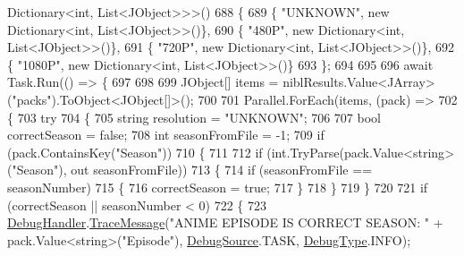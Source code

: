 \begin{DoxyCode}
       Dictionary<int, List<JObject>>>()
688             \{
689                 \{ \textcolor{stringliteral}{"UNKNOWN"}, \textcolor{keyword}{new} Dictionary<int, List<JObject>>()\},
690                 \{ \textcolor{stringliteral}{"480P"}, \textcolor{keyword}{new} Dictionary<int, List<JObject>>()\},
691                 \{ \textcolor{stringliteral}{"720P"}, \textcolor{keyword}{new} Dictionary<int, List<JObject>>()\},
692                 \{ \textcolor{stringliteral}{"1080P"}, \textcolor{keyword}{new} Dictionary<int, List<JObject>>()\}
693             \};
694 
695 
696             await Task.Run(() => \{
697 
698 
699                 JObject[] items = niblResults.Value<JArray>(\textcolor{stringliteral}{"packs"}).ToObject<JObject[]>();
700 
701                 Parallel.ForEach(items, (pack) =>
702                 \{
703                     \textcolor{keywordflow}{try}
704                     \{
705                         \textcolor{keywordtype}{string} resolution = \textcolor{stringliteral}{"UNKNOWN"};
706 
707                         \textcolor{keywordtype}{bool} correctSeason = \textcolor{keyword}{false};
708                         \textcolor{keywordtype}{int} seasonFromFile = -1;
709                         \textcolor{keywordflow}{if} (pack.ContainsKey(\textcolor{stringliteral}{"Season"}))
710                         \{
711 
712                             \textcolor{keywordflow}{if} (\textcolor{keywordtype}{int}.TryParse(pack.Value<\textcolor{keywordtype}{string}>(\textcolor{stringliteral}{"Season"}), out seasonFromFile))
713                             \{
714                                 \textcolor{keywordflow}{if} (seasonFromFile == seasonNumber)
715                                 \{
716                                     correctSeason = \textcolor{keyword}{true};
717                                 \}
718                             \}
719                         \}
720 
721                         \textcolor{keywordflow}{if} (correctSeason || seasonNumber < 0)
722                         \{
723                             \mbox{\hyperlink{class_little_weeb_library_1_1_handlers_1_1_anime_profile_handler_a0b0ae3c3838d26351485e6dfc566a632}{DebugHandler}}.\mbox{\hyperlink{interface_little_weeb_library_1_1_handlers_1_1_i_debug_handler_a2e405bc3492e683cd3702fae125221bc}{TraceMessage}}(\textcolor{stringliteral}{"ANIME EPISODE IS CORRECT
       SEASON: "} + pack.Value<\textcolor{keywordtype}{string}>(\textcolor{stringliteral}{"Episode"}), \mbox{\hyperlink{namespace_little_weeb_library_1_1_handlers_a2a6ca0775121c9c503d58aa254d292be}{DebugSource}}.TASK, \mbox{\hyperlink{namespace_little_weeb_library_1_1_handlers_ab66019ed40462876ec4e61bb3ccb0a62}{DebugType}}.INFO);

\end{DoxyCode}
